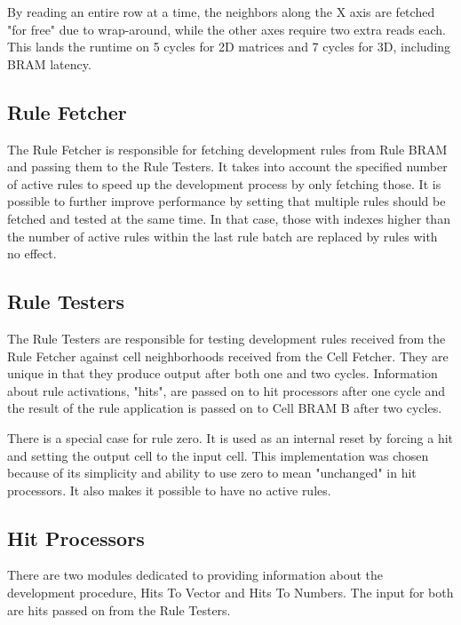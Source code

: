 By reading an entire row at a time, the neighbors along the X axis are fetched "for free" due to wrap-around, while the other axes require two extra reads each.
This lands the runtime on 5 cycles for 2D matrices and 7 cycles for 3D, including BRAM latency.

\subsection{Rule Fetcher}

The Rule Fetcher is responsible for fetching development rules from Rule BRAM and passing them to the Rule Testers.
It takes into account the specified number of active rules to speed up the development process by only fetching those.
It is possible to further improve performance by setting that multiple rules should be fetched and tested at the same time.
In that case, those with indexes higher than the number of active rules within the last rule batch are replaced by rules with no effect.

\subsection{Rule Testers}

The Rule Testers are responsible for testing development rules received from the Rule Fetcher against cell neighborhoods received from the Cell Fetcher.
They are unique in that they produce output after both one and two cycles.
Information about rule activations, "hits", are passed on to hit processors after one cycle and the result of the rule application is passed on to Cell BRAM B after two cycles.

There is a special case for rule zero.
It is used as an internal reset by forcing a hit and setting the output cell to the input cell.
This implementation was chosen because of its simplicity and ability to use zero to mean "unchanged" in hit processors.
It also makes it possible to have no active rules.

\subsection{Hit Processors}

There are two modules dedicated to providing information about the development procedure, Hits To Vector and Hits To Numbers.
The input for both are hits passed on from the Rule Testers.

